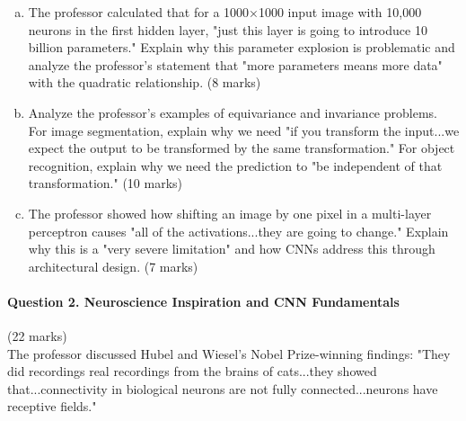 \documentclass[12pt]{article}
\newcommand{\shortanswer}{\vspace{2cm}}
\newcommand{\mediumanswer}{\vspace{3cm}}
\begin{document}
\begin{enumerate}[(a)]
    \item The professor calculated that for a 1000×1000 input image with 10,000 neurons in the first hidden layer, "just this layer is going to introduce 10 billion parameters." Explain why this parameter explosion is problematic and analyze the professor's statement that "more parameters means more data" with the quadratic relationship. \hfill (8 marks)
    
    \mediumanswer
    
    \item Analyze the professor's examples of equivariance and invariance problems. For image segmentation, explain why we need "if you transform the input...we expect the output to be transformed by the same transformation." For object recognition, explain why we need the prediction to "be independent of that transformation." \hfill (10 marks)
    
    \mediumanswer
    
    \item The professor showed how shifting an image by one pixel in a multi-layer perceptron causes "all of the activations...they are going to change." Explain why this is a "very severe limitation" and how CNNs address this through architectural design. \hfill (7 marks)
    
    \shortanswer
\end{enumerate}

\newpage
\paragraph{Question 2. Neuroscience Inspiration and CNN Fundamentals}{\hfill (22 marks)}\\
The professor discussed Hubel and Wiesel's Nobel Prize-winning findings: "They did recordings real recordings from the brains of cats...they showed that...connectivity in biological neurons are not fully connected...neurons have receptive fields."
\end{document}

